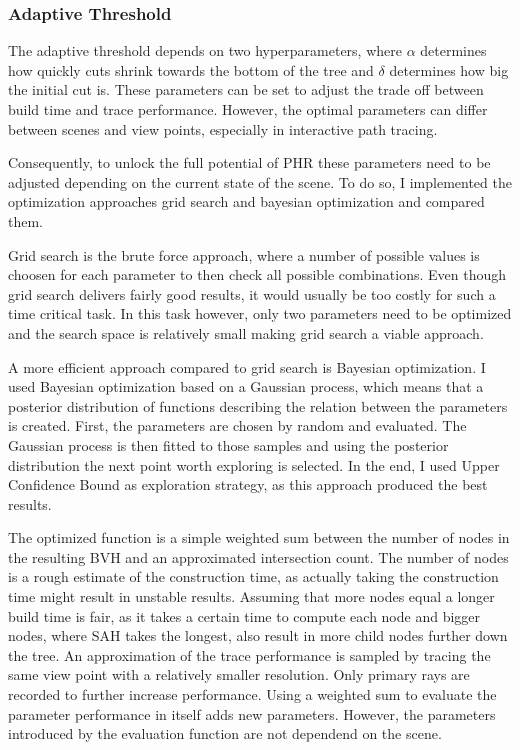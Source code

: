 \subsubsection{Adaptive Threshold}
\label{adaptive threshold}
The adaptive threshold depends on two hyperparameters, where $\alpha$ determines how quickly cuts shrink towards the bottom of the tree and $\delta$ determines how big the initial cut is. These parameters can be set to adjust the trade off between build time and trace performance. However, the optimal parameters can differ between scenes and view points, especially in interactive path tracing. 



Consequently, to unlock the full potential of PHR these parameters need to be adjusted depending on the current state of the scene. To do so, I implemented the optimization approaches grid search and bayesian optimization and compared them.

Grid search is the brute force approach, where a number of possible values is choosen for each parameter to then check all possible combinations. Even though grid search delivers fairly good results, it would usually be too costly for such a time critical task. In this task however, only two parameters need to be optimized and the search space is relatively small making grid search a viable approach. 

A more efficient approach compared to grid search is Bayesian optimization. I used Bayesian optimization based on a Gaussian process, which means that a posterior distribution of functions describing the relation between the parameters is created. First, the parameters are chosen by random and evaluated. The Gaussian process is then fitted to those samples and using the posterior distribution the next point worth exploring is selected. In the end, I used Upper Confidence Bound as exploration strategy, as this approach produced the best results. 

The optimized function is a simple weighted sum between the number of nodes in the resulting BVH and an approximated intersection count. The number of nodes is a rough estimate of the construction time, as actually taking the construction time might result in unstable results. Assuming that more nodes equal a longer build time is fair, as it takes a certain time to compute each node and bigger nodes, where SAH takes the longest, also result in more child nodes further down the tree. An approximation of the trace performance is sampled by tracing the same view point with a relatively smaller resolution. Only primary rays are recorded to further increase performance. 
Using a weighted sum to evaluate the parameter performance in itself adds new parameters. However, the parameters introduced by the evaluation function are not dependend on the scene. %